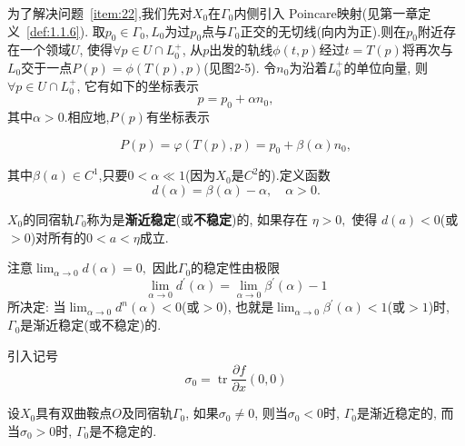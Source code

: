 为了解决问题~\ref{item:22},我们先对$X_{0}$在$\Gamma_0$内侧引入
Poincare映射(见第一章定义~\ref{def:1.1.6}).
取$p_{0} \in \Gamma_{0}, L_{0}$为过$p_0$点与$\Gamma_0$正交的无切线(向内为正).则在$p_0$附近存在一个领域$U$,
使得$\forall p \in U \cap L_{0}^{+}$,
从$p$出发的轨线$\phi(t,p)$经过$t=T(p)$将再次与$L_0$交于一点$P(p)=\phi(T(p),p)$(见图2-5).
令$n_0$为沿着$L_0^{+}$的单位向量,
则$\forall p \in U\cap L_{0}^{+}$,
它有如下的坐标表示
\begin{equation}
  \label{eq:2.4.3}
  p=p_{0}+\alpha n_{0},
\end{equation}
其中$\alpha>0.$相应地,$P(p)$有坐标表示

\begin{equation}
  \label{eq:2.4.4}
  P(p)=\varphi(T(p), p)=p_{0}+\beta(\alpha) n_{0},
\end{equation}

其中$\beta(a) \in C^{1}$,只要$0<\alpha \ll 1$(因为$X_{0}\text{是}C^2$的).定义函数
$$
d(\alpha)=\beta(\alpha)-\alpha, \quad \alpha>0.
$$

\begin{defination}
  \label{def:2.4.4}
  $X_0$的同宿轨$\Gamma_0$称为是\textbf{渐近稳定}(或\textbf{不稳定})的,
  如果存在
$
\eta>0,
$
使得
$d(a)<0$(或$>0$)对所有的$0<a<\eta$成立.
\end{defination}
\begin{collory}
  \label{col:2.4.2}
  注意$\lim _{\alpha \rightarrow 0} d(\alpha)=0,$
  因此$\Gamma_{0}$的稳定性由极限
  $$
  \lim _{\alpha \to 0} d^{\prime}(\alpha)=\lim _{\alpha \to 0} \beta^{\prime}(\alpha)-1
  $$
  所决定:
  当$\lim _{\alpha \rightarrow 0} d^{n}(\alpha)<0$(或$>0$),
  也就是$\lim _{\alpha \rightarrow 0} \beta^{\prime}(\alpha)<1$(或$>1$)时,
  $\Gamma_0$是渐近稳定(或不稳定)的.
\end{collory}

引入记号
$$
\sigma_{0}=\operatorname{tr} \frac{\partial f}{\partial x}(0,0)
$$

\begin{theorem}
  \label{thm:2.4.3}
  设$X_0$具有双曲鞍点$O$及同宿轨$\Gamma_{0}$,
  如果$\sigma_0 \neq 0$,
  则当$\sigma_0 <0$时,
  $\Gamma_0$是渐近稳定的,
  而当$\sigma_0>0$时,
  $\Gamma_0$是不稳定的.
\end{theorem}

